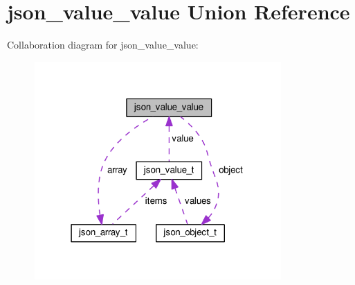 \hypertarget{unionjson__value__value}{\section{json\-\_\-value\-\_\-value Union Reference}
\label{unionjson__value__value}
}


Collaboration diagram for json\-\_\-value\-\_\-value\-:\nopagebreak
\begin{figure}[H]
\begin{center}
\leavevmode
\includegraphics[width=267pt]{unionjson__value__value__coll__graph}
\end{center}
\end{figure}
